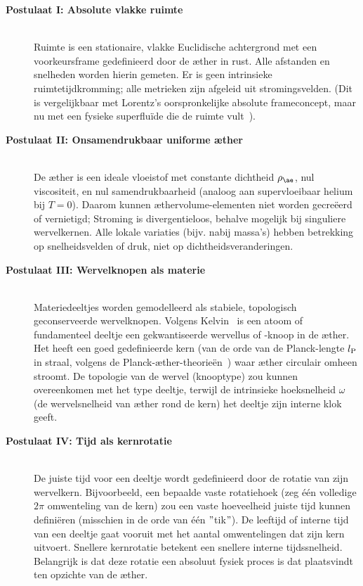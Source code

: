 \begin{description}

    \item[\textbf{Postulaat I: Absolute vlakke ruimte}] \hfill \\
    Ruimte is een stationaire, vlakke Euclidische achtergrond met een voorkeursframe gedefinieerd door de æther in rust. Alle afstanden en snelheden worden hierin gemeten. Er is geen intrinsieke ruimtetijdkromming; alle metrieken zijn afgeleid uit stromingsvelden. (Dit is vergelijkbaar met Lorentz's oorspronkelijke absolute frameconcept, maar nu met een fysieke superfluïde die de ruimte vult~\cite{Winterberg2002-PlanckAether}).

    \item[\textbf{Postulaat II: Onsamendrukbaar uniforme æther}] \hfill \\
    De æther is een ideale vloeistof met constante dichtheid $\rho_{\ae}$, nul viscositeit, en nul samendrukbaarheid (analoog aan supervloeibaar helium bij $T=0$). Daarom kunnen æthervolume-elementen niet worden gecreëerd of vernietigd; Stroming is divergentieloos, behalve mogelijk bij singuliere wervelkernen.  Alle lokale variaties (bijv. nabij massa's) hebben betrekking op snelheidsvelden of druk, niet op dichtheidsveranderingen.

    \item[\textbf{Postulaat III: Wervelknopen als materie}] \hfill \\
    Materiedeeltjes worden gemodelleerd als stabiele, topologisch geconserveerde wervelknopen. Volgens Kelvin~\cite{Kelvin1867-vortex} is een atoom of fundamenteel deeltje een gekwantiseerde wervellus of -knoop in de æther. Het heeft een goed gedefinieerde kern (van de orde van de Planck-lengte $l_{\textrm P}$ in straal, volgens de Planck-æther-theorieën~\cite{Winterberg2002-PlanckAether}) waar æther circulair omheen stroomt. De topologie van de wervel (knooptype) zou kunnen overeenkomen met het type deeltje, terwijl de intrinsieke hoeksnelheid $\omega$ (de wervelsnelheid van æther rond de kern) het deeltje zijn interne klok geeft.

    \item[\textbf{Postulaat IV: Tijd als kernrotatie}] \hfill \\
    De juiste tijd voor een deeltje wordt gedefinieerd door de rotatie van zijn wervelkern. Bijvoorbeeld, een bepaalde vaste rotatiehoek (zeg één volledige $2\pi$ omwenteling van de kern) zou een vaste hoeveelheid juiste tijd kunnen definiëren (misschien in de orde van één \("\)tik\("\)). De leeftijd of interne tijd van een deeltje gaat vooruit met het aantal omwentelingen dat zijn kern uitvoert. Snellere kernrotatie betekent een snellere interne tijdssnelheid. Belangrijk is dat deze rotatie een absoluut fysiek proces is dat plaatsvindt ten opzichte van de æther.


\end{description}
